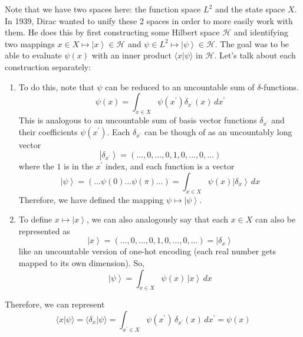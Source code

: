 \documentclass{article}
\newcommand{\ket}[1]{\ensuremath{\left|#1\right\rangle}}
\newcommand{\braket}[2]{\langle #1 | #2 \rangle}
\theoremstyle{definition}
\begin{document}
      Note that we have two spaces here: the function space $L^2$ and the state space $X$. In 1939, Dirac wanted to unify these 2 spaces in order to more easily work with them. He does this by first constructing some Hilbert space $\mathcal{H}$ and identifying two mappings $x \in X \mapsto \ket{x} \in \mathcal{H}$ and $\psi \in L^2 \mapsto \ket{\psi} \in \mathcal{H}$. The goal was to be able to evaluate $\psi(x)$ with an inner product $\braket{x}{\psi}$ in $\mathcal{H}$. Let's talk about each construction separately: 
      \begin{enumerate} 
        \item To do this, note that $\psi$ can be reduced to an uncountable sum of $\delta$-functions. 
          \begin{equation} 
            \psi(x) = \int_{x \in X} \psi(x^\prime) \delta_{x^\prime} (x) \,dx^\prime 
          \end{equation}
        This is analogous to an uncountable sum of basis vector functions $\delta_{x^\prime}$ and their coefficients $\psi(x^\prime)$. Each $\delta_{x^\prime}$ can be though of as an uncountably long vector 
        \begin{equation} 
          \ket{\delta_{x^\prime}} = (\ldots, 0, \ldots, 0, 1, 0, \ldots, 0, \ldots)
        \end{equation}
        where the $1$ is in the $x^\prime$ index, and each function is a vector 
        \begin{equation} 
          \ket{\psi} = (\ldots \psi(0) \ldots \psi(\pi) \ldots) = \int_{x \in X} \psi(x) \ket{\delta_x} \,dx 
        \end{equation}
        Therefore, we have defined the mapping $\psi \mapsto \ket{\psi}$. 

      \item To define $x \mapsto \ket{x}$, we can also analogously say that each $x \in X$ can also be represented as 
        \begin{equation} 
          \ket{x} = (\ldots, 0, \ldots, 0, 1, 0, \ldots, 0, \ldots) = \ket{\delta_x}
        \end{equation}
        like an uncountable version of one-hot encoding (each real number gets mapped to its own dimension). So, 
        \begin{equation} 
          \ket{\psi} = \int_{x \in X} \psi(x) \, \ket{x} \,dx 
        \end{equation}
      \end{enumerate}

      Therefore, we can represent 
      \begin{equation} 
        \braket{x}{\psi} = \braket{\delta_x}{\psi} = \int_{x^\prime \in X} \psi(x^\prime) \, \delta_{x^\prime}(x) \,dx^\prime = \psi(x) 
      \end{equation}
\end{document}
